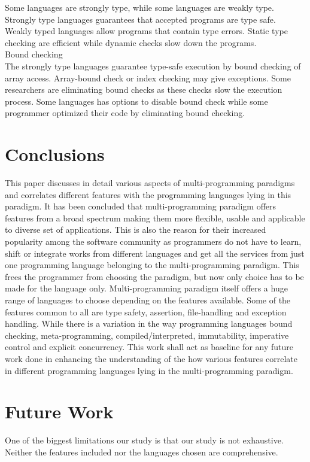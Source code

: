 \documentclass{sig-alternate}
\begin{document}
	Some languages are strongly type, while some languages are weakly type. Strongly type languages guarantees that accepted programs are type safe.\\
	
	Weakly typed languages allow programs that contain type errors. Static type checking are efficient while dynamic checks slow down the programs. \\
	
	Bound checking\\
	
	The strongly type languages guarantee type-safe execution by bound checking of array access. Array-bound check or index checking may give exceptions.
	Some researchers are eliminating bound checks as these checks slow the execution process. Some languages has options to disable bound check while some programmer optimized their code by eliminating bound checking.\\
	
	
	\section{Conclusions}
	This paper discusses in detail various aspects of multi-programming paradigms and correlates different features with the programming languages lying in this paradigm. It has been concluded that multi-programming paradigm offers features from a broad spectrum making them more flexible, usable and applicable to diverse set of applications. This is also the reason for their increased popularity among the software community as programmers do not have to learn, shift or integrate works from different languages and get all the services from just one programming language belonging to the multi-programming paradigm. This frees the programmer from choosing the paradigm, but now only choice has to be made for the language only. Multi-programming paradigm itself offers a huge range of languages to choose depending on the features available. Some of the features common to all are type safety, assertion, file-handling and exception handling. While there is a variation in the way programming languages bound checking, meta-programming, compiled/interpreted, immutability, imperative control and explicit concurrency. This work shall act as baseline for any future work done in enhancing the understanding of the how various features correlate in different programming languages lying in the multi-programming paradigm.
	
	\section{Future Work}
	One of the biggest limitations our study is that our study is not exhaustive. Neither the features included nor the languages chosen are comprehensive.
	
\end{document}
